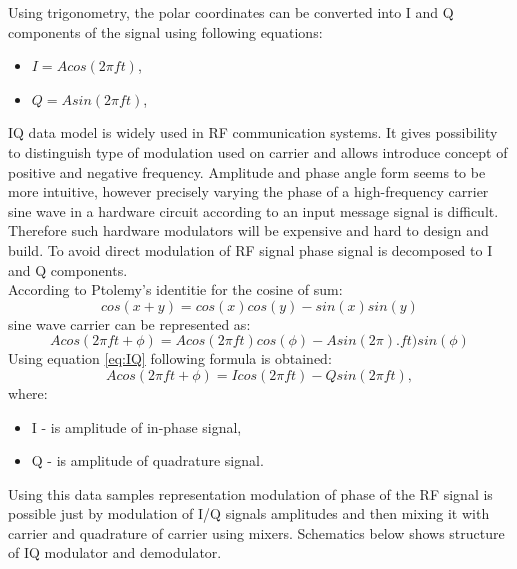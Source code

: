 \documentclass[en,printmode]{mgr}
\begin{document}
		\newpage
		Using trigonometry, the polar coordinates can be converted into I and Q components of the signal using following
		equations:
		\begin{itemize}
			\item $I = A cos\left(2\pi f t\right)$, \label{eq:IQ}
			\item $Q = A sin\left(2\pi f t\right)$,
		\end{itemize}
		\vspace{0.5cm}
		
		IQ data model is widely used in RF communication systems. It gives possibility to distinguish type of 
		modulation used 
		on carrier and allows introduce concept of positive and negative frequency. Amplitude and phase angle form
		seems to be more intuitive, however precisely varying the phase of a high-frequency carrier sine wave in a
		hardware circuit according to an input message signal is difficult. Therefore such hardware modulators will
		be expensive and hard to design and build. To avoid direct modulation of RF signal phase signal is decomposed
		to I and Q components.
		\\
		
		According to Ptolemy’s identitie for the cosine of sum:
		\[
			cos\left(x+y\right) = 
			cos\left(x\right)  cos\left(y\right) - sin\left(x\right) sin\left(y\right)
		\] 
		sine wave carrier can be represented as:
		\[
			Acos\left(2\pi ft + \phi\right) = 
			Acos\left(2\pi ft\right)cos\left(\phi\right) - Asin\left(2\pi\right). ft)sin(\phi)
		\]
		Using equation \ref{eq:IQ} following formula is obtained:
		\[
			Acos\left(2\pi ft + \phi\right) = 
			I cos\left(2\pi f t\right) - Q sin\left(2\pi f t\right),
		\]
		where:
		\begin{itemize}
			\item I - is amplitude of in-phase signal,
			\item Q - is amplitude of quadrature signal.
		\end{itemize}
		
		Using this data samples representation modulation of phase of the RF signal is possible just by modulation of
		I/Q signals amplitudes and then mixing it with carrier and quadrature of carrier using mixers. Schematics below 
		shows structure of IQ modulator and demodulator.
		
\end{document}
